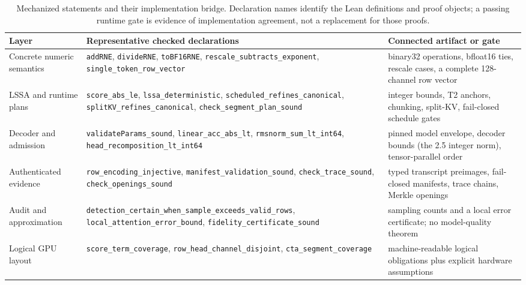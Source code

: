 \documentclass{article}
\begin{document}
\begin{table}[ht]
\centering
\footnotesize
\begin{tabular}{>{\raggedright\arraybackslash}p{}>{\raggedright\arraybackslash}p{}>{\raggedright\arraybackslash}p{}}
\toprule
Layer & Representative checked declarations & Connected artifact or gate \\
\midrule
Concrete numeric semantics & \texttt{addRNE}, \texttt{divideRNE}, \texttt{toBF16RNE}, \texttt{rescale\_subtracts\_exponent}, \texttt{single\_token\_row\_vector} & binary32 operations, bfloat16 ties, rescale cases, a complete 128-channel row vector \\
\addlinespace[0.35em]
LSSA and runtime plans & \texttt{score\_abs\_le}, \texttt{lssa\_deterministic}, \texttt{scheduled\_refines\_canonical}, \texttt{splitKV\_refines\_canonical}, \texttt{check\_segment\_plan\_sound} & integer bounds, T2 anchors, chunking, split-KV, fail-closed schedule gates \\
\addlinespace[0.35em]
Decoder and admission & \texttt{validateParams\_sound}, \texttt{linear\_acc\_abs\_lt}, \texttt{rmsnorm\_sum\_lt\_int64}, \texttt{head\_recomposition\_lt\_int64} & pinned model envelope, decoder bounds (the 2.5 integer norm), tensor-parallel order \\
\addlinespace[0.35em]
Authenticated evidence & \texttt{row\_encoding\_injective}, \texttt{manifest\_validation\_sound}, \texttt{check\_trace\_sound}, \texttt{check\_openings\_sound} & typed transcript preimages, fail-closed manifests, trace chains, Merkle openings \\
\addlinespace[0.35em]
Audit and approximation & \texttt{detection\_certain\_when\_sample\_exceeds\_valid\_rows}, \texttt{local\_attention\_error\_bound}, \texttt{fidelity\_certificate\_sound} & sampling counts and a local error certificate; no model-quality theorem \\
\addlinespace[0.35em]
Logical GPU layout & \texttt{score\_term\_coverage}, \texttt{row\_head\_channel\_disjoint}, \texttt{cta\_segment\_coverage} & machine-readable logical obligations plus explicit hardware assumptions \\
\bottomrule
\end{tabular}
\caption{Mechanized statements and their implementation bridge.  Declaration names identify
the Lean definitions and proof objects; a passing runtime gate is evidence of implementation
agreement, not a replacement for those proofs.}
\label{tab:lean}
\end{table}
\end{document}
